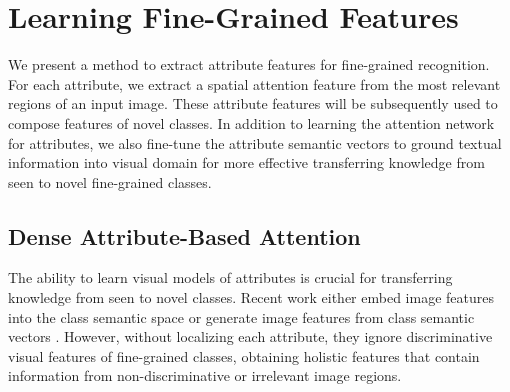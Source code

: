 \documentclass[10pt,journal,compsoc]{IEEEtran}
\newcommand{\1}{\boldsymbol{1}}
\newcommand{\0}{\boldsymbol{0}}
\newcommand{\<}{\langle}
\renewcommand{\>}{\rangle}
\begin{document}
\section{Learning Fine-Grained Features}
\label{sec:fine_grained_features}
We present a method to extract attribute features for fine-grained recognition. For each attribute, we extract a spatial attention feature from the most relevant regions of an input image.
These attribute features will be subsequently used to compose features of novel classes.
In addition to learning the attention network for attributes, we also fine-tune the attribute semantic vectors to ground textual information into visual domain for more effective transferring knowledge from seen to novel fine-grained classes.


\subsection{Dense Attribute-Based Attention}
The ability to learn visual models of attributes is crucial for transferring knowledge from seen to novel classes. Recent work either embed image features into the class semantic space \cite{Changpinyo:CVPR16,Frome:NIPS13,Norouzi:ICLR14,Xian:CVPR16,Zhang:CVPR16} or generate image features from class semantic vectors \cite{Felix:ECCV18,Xian:CVPR19,Schonfeld:CVPR19,Xian:CVPR18}. However, without localizing each attribute, they ignore discriminative visual features of fine-grained classes, obtaining holistic features that contain information from non-discriminative or irrelevant image regions.
\end{document}
